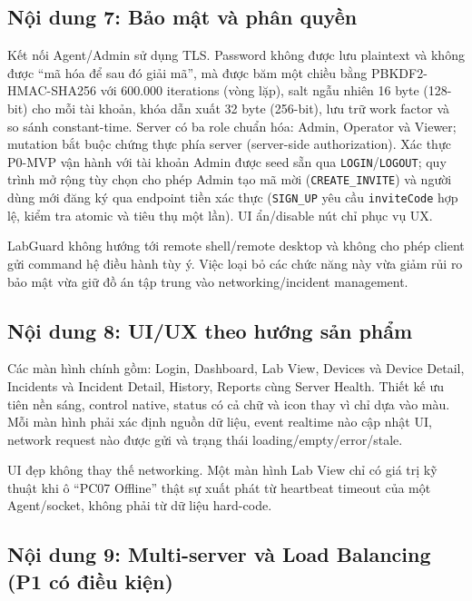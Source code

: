 \subsection{Nội dung 7: Bảo mật và phân quyền}

Kết nối Agent/Admin sử dụng TLS. Password không được lưu plaintext và không được ``mã hóa để sau đó giải mã'', mà được băm một chiều bằng PBKDF2-HMAC-SHA256 với 600.000 iterations (vòng lặp), salt ngẫu nhiên 16 byte (128-bit) cho mỗi tài khoản, khóa dẫn xuất 32 byte (256-bit), lưu trữ work factor và so sánh constant-time. Server có ba role chuẩn hóa: Admin, Operator và Viewer; mutation bắt buộc chứng thực phía server (server-side authorization). Xác thực P0-MVP vận hành với tài khoản Admin được seed sẵn qua \texttt{LOGIN}/\texttt{LOGOUT}; quy trình mở rộng tùy chọn cho phép Admin tạo mã mời (\texttt{CREATE\_INVITE}) và người dùng mới đăng ký qua endpoint tiền xác thực (\texttt{SIGN\_UP} yêu cầu \texttt{inviteCode} hợp lệ, kiểm tra atomic và tiêu thụ một lần). UI ẩn/disable nút chỉ phục vụ UX.

\begin{warningbox}
LabGuard không hướng tới remote shell/remote desktop và không cho phép client gửi command hệ điều hành tùy ý. Việc loại bỏ các chức năng này vừa giảm rủi ro bảo mật vừa giữ đồ án tập trung vào networking/incident management.
\end{warningbox}

\subsection{Nội dung 8: UI/UX theo hướng sản phẩm}

Các màn hình chính gồm: Login, Dashboard, Lab View, Devices và Device Detail, Incidents và Incident Detail, History, Reports cùng Server Health. Thiết kế ưu tiên nền sáng, control native, status có cả chữ và icon thay vì chỉ dựa vào màu. Mỗi màn hình phải xác định nguồn dữ liệu, event realtime nào cập nhật UI, network request nào được gửi và trạng thái loading/empty/error/stale.

\begin{beginnerbox}
UI đẹp không thay thế networking. Một màn hình Lab View chỉ có giá trị kỹ thuật khi ô ``PC07 Offline'' thật sự xuất phát từ heartbeat timeout của một Agent/socket, không phải từ dữ liệu hard-code.
\end{beginnerbox}

\subsection{Nội dung 9: Multi-server và Load Balancing (P1 có điều kiện)}


